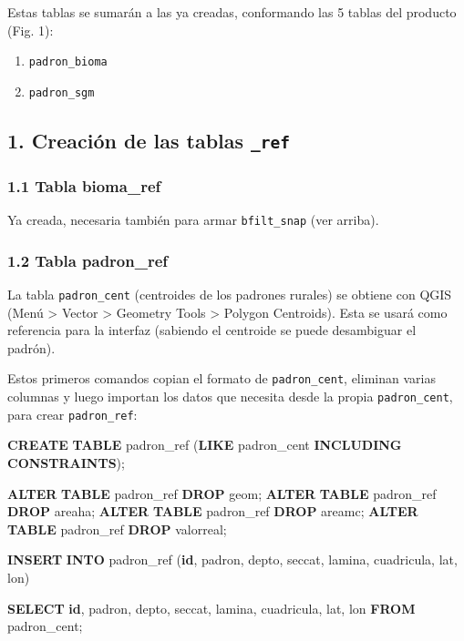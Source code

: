 \documentclass[spanish,]{article}
\newenvironment{Shaded}{}{}
\newcommand{\KeywordTok}[1]{\textcolor[rgb]{0.00,0.44,0.13}{\textbf{{#1}}}}
\newcommand{\NormalTok}[1]{{#1}}
\providecommand{\tightlist}{%
  \setlength{\itemsep}{0pt}\setlength{\parskip}{0pt}}
\begin{document}
Estas tablas se sumarán a las ya creadas, conformando las 5 tablas del
producto (Fig. 1):

\begin{enumerate}
\def\labelenumi{\arabic{enumi}.}
\setcounter{enumi}{3}
\tightlist
\item
  \texttt{padron\_bioma}
\item
  \texttt{padron\_sgm}
\end{enumerate}

\subsection{\texorpdfstring{1. Creación de las tablas
\texttt{\_ref}}{1. Creación de las tablas \_ref}}\label{creaciuxf3n-de-las-tablas-ux5fref}

\subsubsection{1.1 Tabla bioma\_ref}\label{tabla-biomaux5fref}

Ya creada, necesaria también para armar \texttt{bfilt\_snap} (ver
arriba).

\subsubsection{1.2 Tabla padron\_ref}\label{tabla-padronux5fref}

La tabla \texttt{padron\_cent} (centroides de los padrones rurales) se
obtiene con QGIS (Menú \textgreater{} Vector \textgreater{} Geometry
Tools \textgreater{} Polygon Centroids). Esta se usará como referencia
para la interfaz (sabiendo el centroide se puede desambiguar el padrón).

Estos primeros comandos copian el formato de \texttt{padron\_cent},
eliminan varias columnas y luego importan los datos que necesita desde
la propia \texttt{padron\_cent}, para crear \texttt{padron\_ref}:

\begin{Shaded}
\begin{Highlighting}[]
\KeywordTok{CREATE} \KeywordTok{TABLE} \NormalTok{padron_ref (}\KeywordTok{LIKE} \NormalTok{padron_cent }\KeywordTok{INCLUDING} \KeywordTok{CONSTRAINTS}\NormalTok{);}

\KeywordTok{ALTER} \KeywordTok{TABLE} \NormalTok{padron_ref }\KeywordTok{DROP} \NormalTok{geom;}
\KeywordTok{ALTER} \KeywordTok{TABLE} \NormalTok{padron_ref }\KeywordTok{DROP} \NormalTok{areaha;}
\KeywordTok{ALTER} \KeywordTok{TABLE} \NormalTok{padron_ref }\KeywordTok{DROP} \NormalTok{areamc;}
\KeywordTok{ALTER} \KeywordTok{TABLE} \NormalTok{padron_ref }\KeywordTok{DROP} \NormalTok{valorreal;}

\KeywordTok{INSERT} \KeywordTok{INTO} \NormalTok{padron_ref (}\KeywordTok{id}\NormalTok{, padron, depto, seccat, lamina, cuadricula, lat, lon)}

\KeywordTok{SELECT} \KeywordTok{id}\NormalTok{, padron, depto, seccat, lamina, cuadricula, lat, lon}
  \KeywordTok{FROM} \NormalTok{padron_cent;}
\end{Highlighting}
\end{Shaded}
\end{document}

